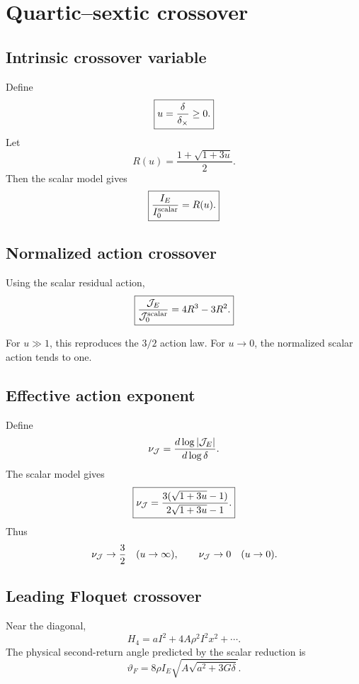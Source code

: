 \section{Quartic--sextic crossover}
\label{sec:crossover}

\subsection{Intrinsic crossover variable}

Define
\[
\boxed{
u=\frac{\delta}{\delta_\times}\ge0.
}
\]
Let
\[
R(u)=\frac{1+\sqrt{1+3u}}{2}.
\]
Then the scalar model gives
\begin{equation}
\boxed{
\frac{I_E}{I_0^{\rm scalar}}
=
R(u).
}
\label{eq:R-crossover}
\end{equation}

\subsection{Normalized action crossover}

Using the scalar residual action,
\begin{equation}
\boxed{
\frac{\mathcal{J}_E}{\mathcal{J}_0^{\rm scalar}}
=
4R^3-3R^2.
}
\label{eq:action-crossover}
\end{equation}

For \(u\gg1\), this reproduces the \(3/2\) action law. For \(u\to0\), the normalized scalar action tends to one.

\subsection{Effective action exponent}

Define
\[
\nu_{\mathcal{J}}
=
\frac{d\log|\mathcal{J}_E|}{d\log\delta}.
\]
The scalar model gives
\[
\boxed{
\nu_{\mathcal{J}}
=
\frac{3(\sqrt{1+3u}-1)}
{2\sqrt{1+3u}-1}.
}
\]
Thus
\[
\nu_{\mathcal{J}}\to\frac32
\quad(u\to\infty),
\qquad
\nu_{\mathcal{J}}\to0
\quad(u\to0).
\]

\subsection{Leading Floquet crossover}

Near the diagonal,
\[
H_4
=
aI^2+4A\rho^2I^2x^2+\cdots.
\]
The physical second-return angle predicted by the scalar reduction is
\begin{equation}
\boxed{
\vartheta_F
=
8\rho I_E
\sqrt{
A\sqrt{a^2+3G\delta}
}.
}
\label{eq:thetaF}
\end{equation}

